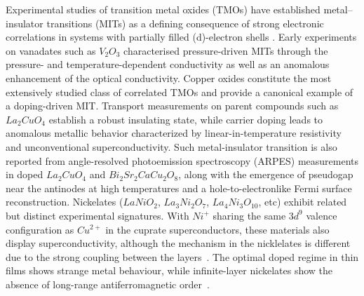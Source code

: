 Experimental studies of transition metal oxides (TMOs) have established metal–insulator transitions (MITs) as a defining consequence of strong electronic correlations in systems with partially filled (d)-electron shells \cite{Imada1998,mcwhan1969}. Early experiments on vanadates such as $V_2O_3$ characterised pressure-driven MITs through the pressure- and temperature-dependent conductivity as well as an anomalous enhancement of the optical conductivity\cite{Limelette2003,Rozenberg1995,Qazilbash2007}. Copper oxides constitute the most extensively studied class of correlated TMOs and provide a canonical example of a doping-driven MIT. Transport measurements on parent compounds such as $La_2CuO_4$ establish a robust insulating state, while carrier doping leads to anomalous metallic behavior characterized by linear-in-temperature resistivity and unconventional superconductivity\cite{Takagi1992,Ando2004,Lemberger2011}. Such metal-insulator transition is also reported from angle-resolved photoemission spectroscopy (ARPES) measurements in doped $La_2CuO_4$ and $Bi_2Sr_2CaCu_2O_8$, along with the emergence of pseudogap near the antinodes at high temperatures and a hole-to-electronlike Fermi surface reconstruction\cite{Damascelli2003,Sobota2021,Vishik_2018}. Nickelates ($LaNiO_2$, $La_3Ni_2O_7$, $La_4Ni_3O_{10}$, etc) exhibit related but distinct experimental signatures. With \(Ni^+\) sharing the same \(3d^9\) valence configuration as \(Cu^{2+}\) in the cuprate superconductors, these materials also display superconductivity, although the mechanism in the nicklelates is different due to the strong coupling between the layers~\cite{Medarde_1997,Wang2025}. The optimal doped regime in thin films shows strange metal behaviour, while infinite-layer nickelates show the absence of long-range antiferromagnetic order~\cite{Puphal2026}.

